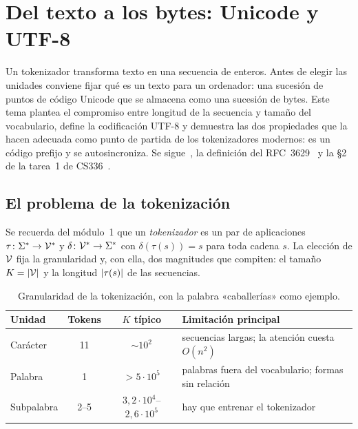 \chapter{Del texto a los bytes: Unicode y UTF-8}
\label{tema:1}

Un tokenizador transforma texto en una secuencia de enteros. Antes de elegir las unidades conviene fijar qué es un texto para un ordenador: una sucesión de puntos de código Unicode que se almacena como una sucesión de bytes. Este tema plantea el compromiso entre longitud de la secuencia y tamaño del vocabulario, define la codificación UTF-8 y demuestra las dos propiedades que la hacen adecuada como punto de partida de los tokenizadores modernos: es un código prefijo y se autosincroniza. Se sigue~\cite[§2.3]{jm3}, la definición del RFC~3629~\cite{rfc3629} y la §2 de la tarea~1 de CS336~\cite{cs336}.

\section{El problema de la tokenización}

Se recuerda del módulo~1 que un \emph{tokenizador} es un par de aplicaciones $\tau\colon\Sigma^{*}\to\mathcal{V}^{*}$ y $\delta\colon\mathcal{V}^{*}\to\Sigma^{*}$ con $\delta(\tau(s))=s$ para toda cadena $s$. La elección de $\mathcal{V}$ fija la granularidad y, con ella, dos magnitudes que compiten: el tamaño $K=\lvert\mathcal{V}\rvert$ y la longitud $\lvert\tau(s)\rvert$ de las secuencias.

\begin{table}[h]
\centering\small
\caption{Granularidad de la tokenización, con la palabra «caballerías» como ejemplo.}\label{tab:granularidad}
\begin{tabularx}{\textwidth}{@{}lcc>{\raggedright\arraybackslash}X@{}}
\toprule
Unidad & Tokens & $K$ típico & Limitación principal \\
\midrule
Carácter & 11 & $\sim 10^{2}$ & secuencias largas; la atención cuesta $O(n^{2})$ \\
Palabra & 1 & $>5\cdot 10^{5}$ & palabras fuera del vocabulario; formas sin relación \\
Subpalabra & 2--5 & $3{,}2\cdot 10^{4}$--$2{,}6\cdot 10^{5}$ & hay que entrenar el tokenizador \\
\bottomrule
\end{tabularx}
\end{table}

